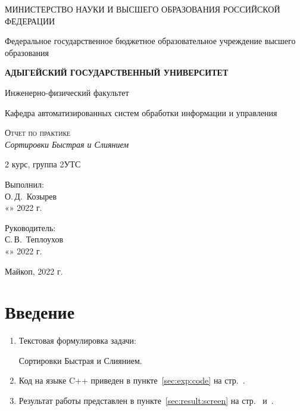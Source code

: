 \documentclass[12pt,a4paper]{scrartcl}
\begin{document}
	\begin{titlepage}
		\begin{center}
			\large
			МИНИСТЕРСТВО НАУКИ И ВЫСШЕГО ОБРАЗОВАНИЯ РОССИЙСКОЙ ФЕДЕРАЦИИ
			
			Федеральное государственное бюджетное образовательное учреждение высшего образования
			
			\textbf{АДЫГЕЙСКИЙ ГОСУДАРСТВЕННЫЙ УНИВЕРСИТЕТ}
			\vspace{0.25cm}
			
			Инженерно-физический факультет
			
			Кафедра автоматизированных систем обработки информации и управления
			\vfill

			\vfill
			
			\textsc{Отчет по практике}\\[5mm]
			
			{\LARGE \textit{Сортировки Быстрая и Слиянием}}
			\bigskip
			
			2 курс, группа 2УТС
		\end{center}
		\vfill
		
		\newlength{\ML}
		\hfill\begin{minipage}{0.5\textwidth}
			Выполнил:\\
			\underline{\hspace{\ML}} О.\,Д.~Козырев\\
			«\underline{\hspace{0.7cm}}» \underline{\hspace{2cm}} 2022 г.
		\end{minipage}%
		\bigskip
		
		\hfill\begin{minipage}{0.5\textwidth}
			Руководитель:\\
			\underline{\hspace{\ML}} С.\,В.~Теплоухов\\
			«\underline{\hspace{0.7cm}}» \underline{\hspace{2cm}} 2022 г.
		\end{minipage}%
		\vfill
		
		\begin{center}
			Майкоп, 2022 г.
		\end{center}
	\end{titlepage}
		
	\section{Введение}
	\label{sec:intro}
	\begin{enumerate}
	\item Текстовая формулировка задачи:
	
	Сортировки Быстрая и Слиянием.
	\item Код на языке C++ приведен в пункте~\ref{sec:exp:code} на стр.~\pageref{sec:exp:code}.
	\item Результат работы представлен в пункте~\ref{sec:result:screen} на стр.~\pageref{figure1:screen} и~\pageref{figure2:screen}.
	\end{enumerate}
	
\end{document}
